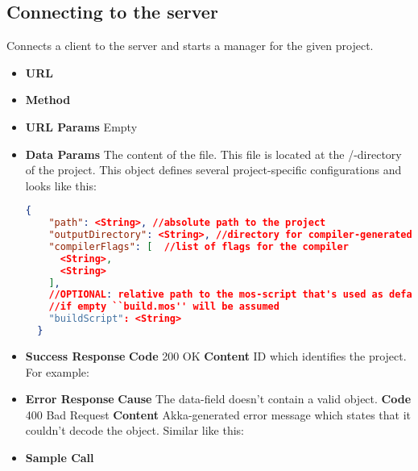 \subsection{Connecting to the server}
Connects a client to the server and starts a manager for the given project.



\begin{itemize}
\item \textbf{URL} 
\item \textbf{Method} 
\item \textbf{URL Params} Empty
\item \textbf{Data Params}
  The content of the  file. This file is located at the /-directory of the project.
  This object defines several project-specific configurations and looks like this:
  \begin{lstlisting}[basicstyle=\small,language=json]
  {
    "path": <String>, //absolute path to the project
    "outputDirectory": <String>, //directory for compiler-generated files
    "compilerFlags": [  //list of flags for the compiler
      <String>,
      <String>
    ],
    //OPTIONAL: relative path to the mos-script that's used as default-script
    //if empty ``build.mos'' will be assumed
    "buildScript": <String>
  }
  \end{lstlisting}
\item \textbf{Success Response}
  \newline\textbf{Code} 200 OK
  \newline\textbf{Content} ID which identifies the project. For example: 
\item \textbf{Error Response}
  \newline\textbf{Cause} The data-field doesn't contain a valid object.
  \newline\textbf{Code} 400 Bad Request
  \newline\textbf{Content} Akka-generated error message which states that it couldn't decode the
  object. Similar like this: 
  \item \textbf{Sample Call}
\end{itemize}
